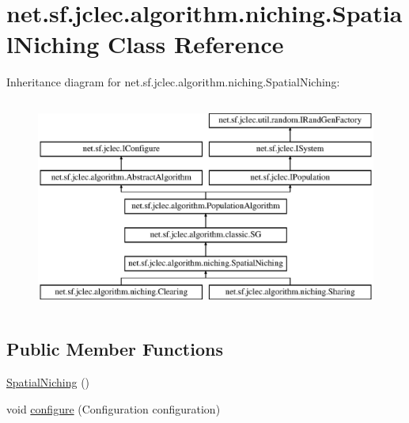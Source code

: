 \hypertarget{classnet_1_1sf_1_1jclec_1_1algorithm_1_1niching_1_1_spatial_niching}{\section{net.\-sf.\-jclec.\-algorithm.\-niching.\-Spatial\-Niching Class Reference}
\label{classnet_1_1sf_1_1jclec_1_1algorithm_1_1niching_1_1_spatial_niching}
}
Inheritance diagram for net.\-sf.\-jclec.\-algorithm.\-niching.\-Spatial\-Niching\-:\begin{figure}[H]
\begin{center}
\leavevmode
\includegraphics[height=7.000000cm]{classnet_1_1sf_1_1jclec_1_1algorithm_1_1niching_1_1_spatial_niching}
\end{center}
\end{figure}
\subsection*{Public Member Functions}
\begin{DoxyCompactItemize}
\item 
\hyperlink{classnet_1_1sf_1_1jclec_1_1algorithm_1_1niching_1_1_spatial_niching_a033cb8ece4626d5d0328fe9a0141501c}{Spatial\-Niching} ()
\item 
void \hyperlink{classnet_1_1sf_1_1jclec_1_1algorithm_1_1niching_1_1_spatial_niching_a70b75c7dd31e0d3eb64849cd3bd5de2a}{configure} (Configuration configuration)
\end{DoxyCompactItemize}
